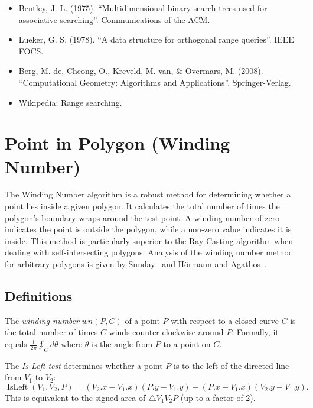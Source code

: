\begin{itemize}
\item Bentley, J. L. (1975). ``Multidimensional binary search trees used for associative searching''. Communications of the ACM.
\item Lueker, G. S. (1978). ``A data structure for orthogonal range queries''. IEEE FOCS.
\item Berg, M. de, Cheong, O., Kreveld, M. van, \& Overmars, M. (2008). ``Computational Geometry: Algorithms and Applications''. Springer-Verlag.
\item Wikipedia: Range searching.
\end{itemize}


\section{Point in Polygon (Winding Number)}
\label{sec:point_in_polygon_winding}

The Winding Number algorithm is a robust method for determining whether a point lies inside a given polygon. It calculates the total number of times the polygon's boundary wraps around the test point. A winding number of zero indicates the point is outside the polygon, while a non-zero value indicates it is inside. This method is particularly superior to the Ray Casting algorithm when dealing with self-intersecting polygons. Analysis of the winding number method for arbitrary polygons is given by Sunday~\cite{sunday2001} and H\"{o}rmann and Agathos~\cite{hormann2001}.

\subsection{Definitions}

\begin{definition}\label{def:winding_number}
The \emph{winding number} $wn(P, C)$ of a point $P$ with respect to a closed curve $C$ is the total number of times $C$ winds counter-clockwise around $P$. Formally, it equals $\frac{1}{2\pi} \oint_C d\theta$ where $\theta$ is the angle from $P$ to a point on $C$.
\end{definition}

\begin{definition}\label{def:is_left}
The \emph{Is-Left test} determines whether a point $P$ is to the left of the directed line from $V_1$ to $V_2$:
\[
\operatorname{IsLeft}(V_1, V_2, P) = (V_2.x - V_1.x)(P.y - V_1.y) - (P.x - V_1.x)(V_2.y - V_1.y).
\]
This is equivalent to the signed area of $\triangle V_1 V_2 P$ (up to a factor of 2).
\end{definition}


